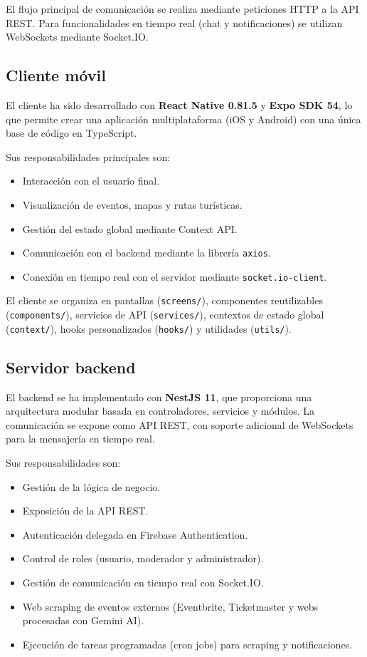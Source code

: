 El flujo principal de comunicación se realiza mediante peticiones HTTP a la API REST. Para funcionalidades en tiempo real (chat y notificaciones) se utilizan WebSockets mediante Socket.IO.

\subsection{Cliente móvil}

El cliente ha sido desarrollado con \textbf{React Native 0.81.5} y \textbf{Expo SDK 54}, lo que permite crear una aplicación multiplataforma (iOS y Android) con una única base de código en TypeScript.

Sus responsabilidades principales son:
\begin{itemize}
    \item Interacción con el usuario final.
    \item Visualización de eventos, mapas y rutas turísticas.
    \item Gestión del estado global mediante Context API.
    \item Comunicación con el backend mediante la librería \texttt{axios}.
    \item Conexión en tiempo real con el servidor mediante \texttt{socket.io-client}.
\end{itemize}

El cliente se organiza en pantallas (\texttt{screens/}), componentes reutilizables (\texttt{components/}), servicios de API (\texttt{services/}), contextos de estado global (\texttt{context/}), hooks personalizados (\texttt{hooks/}) y utilidades (\texttt{utils/}).

\subsection{Servidor backend}

El backend se ha implementado con \textbf{NestJS 11}, que proporciona una arquitectura modular basada en controladores, servicios y módulos. La comunicación se expone como API REST, con soporte adicional de WebSockets para la mensajería en tiempo real.

Sus responsabilidades son:
\begin{itemize}
    \item Gestión de la lógica de negocio.
    \item Exposición de la API REST.
    \item Autenticación delegada en Firebase Authentication.
    \item Control de roles (usuario, moderador y administrador).
    \item Gestión de comunicación en tiempo real con Socket.IO.
    \item Web scraping de eventos externos (Eventbrite, Ticketmaster y webs procesadas con Gemini AI).
    \item Ejecución de tareas programadas (cron jobs) para scraping y notificaciones.
\end{itemize}

